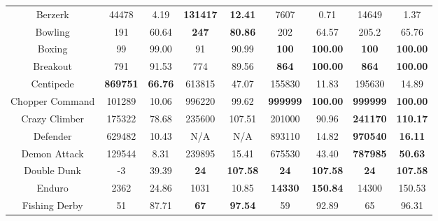 \documentclass[nohyperref]{article}
\newcommand{\best}[1]{\textbf{#1}}
\theoremstyle{plain}
\begin{document}
\begin{table}[!hb]
\begin{center}
\begin{tabular}{| c | c c |  c c| c c| c c|}
 Berzerk         &44478           &4.19                &\textbf{131417}       &\textbf{12.41 }                & 7607              &0.71        &14649             &1.37      \\
 Bowling         &191             &60.64               &\textbf{247}           &\textbf{80.86 }                & 202               &64.57      &205.2             &65.76       \\
 Boxing          &99              &99.00               &91                     &90.99                          & \best{100}        &\best{100.00} &\textbf{100}       &\textbf{100.00}           \\
 Breakout        &791             &91.53               &774                    &89.56                          & \best{864}        &\best{100.00} &\textbf{864}     &\textbf{100.00}          \\
 Centipede       &\textbf{869751} &\textbf{66.76}      &613815                &47.07                          & 155830            &11.83        &195630    &14.89  \\
 Chopper Command &101289       &10.06               &996220                &99.62                          & \best{999999}     &\best{100.00}   &\textbf{999999}    &\textbf{100.00}       \\
 Crazy Climber   &175322       &78.68               &235600       &107.51                & 201000            &90.96           &\textbf{241170}    &\textbf{110.17} \\
 Defender        &629482       &10.43               &N/A                    &N/A                            & 893110     &14.82   &\textbf{970540}    &\textbf{16.11}        \\
 Demon Attack    &129544       &8.31                &239895                 &15.41                          & 675530     &43.40   &\textbf{787985}   &\textbf{50.63}       \\
 Double Dunk     &-3           &39.39               &\textbf{24}            &\textbf{107.58}                         & \best{24}         &\best{107.58}  &\textbf{24}        &\textbf{107.58}         \\
 Enduro          &2362         &24.86               &1031                   &10.85                          & \best{14330}      &\best{150.84}  &14300     &150.53         \\
 Fishing Derby   &51           &87.71               &\textbf{67}            &\textbf{97.54 }                & 59                &92.89          &65        &96.31  \\

\end{tabular}
\end{center}
\end{table}
\end{document}
